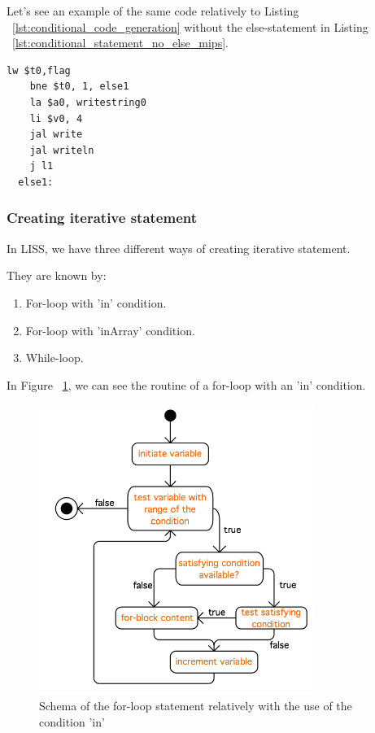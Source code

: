 \documentclass[
  oneside,
  11pt, a4paper,
  footinclude=true,
  headinclude=true,
  cleardoublepage=empty
]{scrbook}
\begin{document}
Let's see an example of the same code relatively to Listing ~\ref{lst:conditional_code_generation} without the else-statement in Listing ~\ref{lst:conditional_statement_no_else_mips}.

\begin{lstlisting}[caption={Code generated for conditional statements without an else-statement in MIPS},label={lst:conditional_statement_no_else_mips}]
    lw $t0,flag		
    bne $t0, 1, else1		
    la $a0, writestring0
    li $v0, 4
    jal write		
    jal writeln		
    j l1		
  else1:
\end{lstlisting}

\subsubsection{Creating iterative statement}

In LISS, we have three different ways of creating iterative statement. 

They are known by:

\begin{enumerate}
\item For-loop with 'in' condition.
\item For-loop with 'inArray' condition.
\item While-loop.
\end{enumerate}

In Figure ~\ref{fig:for-loop_in}, we can see the routine of a for-loop with an 'in' condition.

\begin{figure}[h!]
  \centering
    \includegraphics[width=0.8\textwidth]{img/for-loop_in.png}
    \caption{Schema of the for-loop statement relatively with the use of the condition 'in'}
    \label{fig:for-loop_in}
\end{figure}
\end{document}
